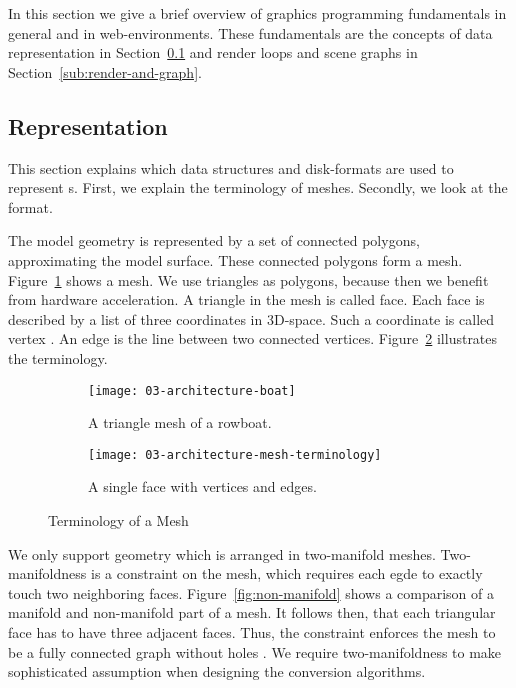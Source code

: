 \documentclass[../ClassicThesis.tex]{subfiles}
\begin{document}
In this section we give a brief overview of graphics programming
fundamentals in general and in web-environments. These fundamentals
are the concepts of {\threedmodel} data representation in
Section~\ref{sub:model-representation} and render loops and scene
graphs in Section~\ref{sub:render-and-graph}.

\subsection{{\threedmodel} Representation}
\label{sub:model-representation}

This section explains which data structures and disk-formats are used
to represent {\threedmodel}s. First, we explain the terminology of
meshes. Secondly, we look at the {\stlfile} format.

The model geometry is represented by a set of connected
polygons, approximating the model surface. These connected
polygons form a mesh. Figure~\ref{fig:term-mesh:mesh} shows
a mesh. We use triangles as polygons, because then we
benefit from hardware acceleration. A triangle in the mesh
is called face. Each face is described by a list of three
coordinates in 3D-space. Such a coordinate is called vertex
\cite[p.~3]{cg-intro}. An edge is the line between two
connected vertices. Figure~\ref{fig:term-mesh:face}
illustrates the terminology.

\begin{figure}[h]
  \centering
  \begin{subfigure}[b]{0.49\textwidth}
    \centering
    \texttt{[image: 03-architecture-boat]}
    \caption{A triangle mesh of a rowboat.}
    \label{fig:term-mesh:mesh}
  \end{subfigure}
  \begin{subfigure}[b]{0.49\textwidth}
    \centering
    \texttt{[image: 03-architecture-mesh-terminology]}
    \caption{A single face with vertices and edges.}
    \label{fig:term-mesh:face}
  \end{subfigure}
  \caption{Terminology of a Mesh}
  \label{fig:term-mesh}
\end{figure}

We only support geometry which is arranged in two-manifold meshes.
Two-manifoldness is a constraint on the mesh, which requires each egde
to exactly touch two neighboring faces. Figure~\ref{fig:non-manifold}
shows a comparison of a manifold and non-manifold part of a mesh. It
follows then, that each triangular face has to have three adjacent
faces. Thus, the constraint enforces the mesh to be a fully connected
graph without holes \cite[p.~28]{master-thesis}. We require
two-manifoldness to make
sophisticated assumption when designing the conversion algorithms.
\end{document}
